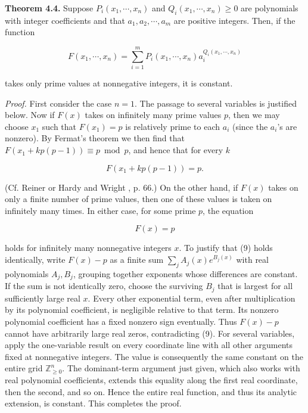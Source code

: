 \documentclass[10pt,letterpaper]{article}
\newcommand{\Nzero}{\mathbb{Z}_{\geq 0}}
\newcommand{\statement}[1]{\par\medskip\noindent\textbf{#1}\enspace}
\begin{document}
\statement{Theorem 4.4.} Suppose $P_{i}\left(x_{1}, \cdots, x_{n}\right)$ and $Q_{i}\left(x_{1}, \cdots, x_{n}\right) \geq 0$ are polynomials with integer coefficients and that $a_{1}, a_{2}, \cdots, a_{m}$ are positive integers. Then, if the function

\[
F\left(x_{1}, \cdots, x_{n}\right)=\sum_{i=1}^{m} P_{i}\left(x_{1}, \cdots, x_{n}\right) a_{i}^{Q_{i}\left(x_{1}, \cdots, x_{n}\right)}
\]

takes only prime values at nonnegative integers, it is constant.

\textit{Proof.} First consider the case $n=1$. The passage to several variables is justified below. Now if $F(x)$ takes on infinitely many prime values $p$, then we may choose $x_{1}$ such that $F\left(x_{1}\right)=p$ is relatively prime to each $a_{i}$ (since the $a_i$'s are nonzero). By Fermat's theorem we then find that $F\left(x_{1}+k p(p-1)\right) \equiv p \bmod p$, and hence that for every $k$


\begin{equation*}
F\left(x_{1}+k p(p-1)\right)=p . \tag{8}
\end{equation*}


(Cf. Reiner \cite{ref13} or Hardy and Wright \cite{ref6}, p. 66.) On the other hand, if $F(x)$ takes on only a finite number of prime values, then one of these values is taken on infinitely many times. In either case, for some prime $p$, the equation


\begin{equation*}
F(x)=p \tag{9}
\end{equation*}


holds for infinitely many nonnegative integers $x$. To justify that (9) holds identically, write $F(x)-p$ as a finite sum
$\sum_j A_j(x)e^{B_j(x)}$ with real polynomials $A_j,B_j$, grouping together exponents
whose differences are constant. If the sum is not identically zero, choose the surviving
$B_j$ that is largest for all sufficiently large real $x$. Every other exponential term,
even after multiplication by its polynomial coefficient, is negligible relative to that term.
Its nonzero polynomial coefficient has a fixed nonzero sign eventually. Thus $F(x)-p$
cannot have arbitrarily large real zeros, contradicting (9). For several variables, apply the one-variable result on every coordinate line with all other arguments fixed at nonnegative integers. The value is consequently the same constant on the entire grid $\Nzero^n$. The dominant-term argument just given, which also works with real polynomial coefficients, extends this equality along the first real coordinate, then the second, and so on. Hence the entire real function, and thus its analytic extension, is constant. This completes the proof.
\end{document}
